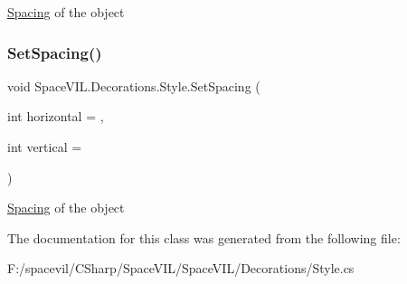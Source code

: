 \mbox{\hyperlink{struct_space_v_i_l_1_1_decorations_1_1_spacing}{Spacing}} of the object 

\mbox{\label{class_space_v_i_l_1_1_decorations_1_1_style_a07b5e0cd117311407ef6a43c351b82cb}} 
\subsubsection{\texorpdfstring{Set\+Spacing()}{SetSpacing()}\hspace{0.1cm}{\footnotesize\ttfamily [2/2]}}
{\footnotesize\ttfamily void Space\+V\+I\+L.\+Decorations.\+Style.\+Set\+Spacing (\begin{DoxyParamCaption}\item[{int}]{horizontal = {},  }\item[{int}]{vertical = {} }\end{DoxyParamCaption})\hspace{0.3cm}{\ttfamily [inline]}}



\mbox{\hyperlink{struct_space_v_i_l_1_1_decorations_1_1_spacing}{Spacing}} of the object 



The documentation for this class was generated from the following file\+:\begin{DoxyCompactItemize}
\item 
F\+:/spacevil/\+C\+Sharp/\+Space\+V\+I\+L/\+Space\+V\+I\+L/\+Decorations/Style.\+cs\end{DoxyCompactItemize}

